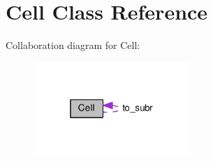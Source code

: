 \hypertarget{classCell}{\section{Cell Class Reference}
\label{classCell}
}


Collaboration diagram for Cell\-:\nopagebreak
\begin{figure}[H]
\begin{center}
\leavevmode
\includegraphics[width=169pt]{classCell__coll__graph}
\end{center}
\end{figure}
